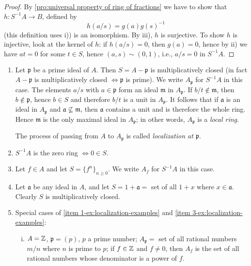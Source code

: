 \begin{proof}
By \eqref{pro:universal property of ring of fractions} we have to show that $h \colon S^{-1}A \to B$, defined by
\[
    h(a/s) = g(a)g(s)^{-1}
\]
(this definition uses i)) is an isomorphism. By iii), $h$ is surjective. To show $h$ is injective, look at the kernel of $h$: if $h(a/s) = 0$, then $g(a) = 0$, hence by ii) we have $at = 0$ for some $t \in S$, hence $(a, s) \sim (0, 1)$, i.e., $a/s = 0$ in $S^{-1}A$.
\end{proof}

\begin{examples}\label{ex:localization-examples}
\begin{enumerate}[(1)]
    \item \label{item 1-ex:localization-examples} Let $\mathfrak{p}$ be a prime ideal of $A$. Then $S = A - \mathfrak{p}$ is multiplicatively closed (in fact $A - \mathfrak{p}$ is multiplicatively closed $\iff \mathfrak{p}$ is prime). We write $A_{\mathfrak{p}}$ for $S^{-1}A$ in this case. The elements $a/s$ with $a \in \mathfrak{p}$ form an ideal $\mathfrak{m}$ in $A_{\mathfrak{p}}$. If $b/t \notin \mathfrak{m}$, then $b \notin \mathfrak{p}$, hence $b \in S$ and therefore $b/t$ is a unit in $A_{\mathfrak{p}}$. It follows that if $\mathfrak{a}$ is an ideal in $A_{\mathfrak{p}}$ and $\mathfrak{a} \not\subseteq \mathfrak{m}$, then $\mathfrak{a}$ contains a unit and is therefore the whole ring. Hence $\mathfrak{m}$ is the only maximal ideal in $A_{\mathfrak{p}}$; in other words, $A_{\mathfrak{p}}$ is a \emph{local ring}.

    The process of passing from $A$ to $A_{\mathfrak{p}}$ is called \emph{localization at $\mathfrak{p}$}.

    \item \label{item 2-ex:localization-examples} $S^{-1}A$ is the zero ring $\iff 0 \in S$.
    \item \label{item 3-ex:localization-examples} Let $f \in A$ and let $S = \{f^n\}_{n \geq 0}$. We write $A_f$ for $S^{-1}A$ in this case.
    \item \label{item 4-ex:localization-examples} Let $\mathfrak{a}$ be any ideal in $A$, and let $S = 1 + \mathfrak{a} = $ set of all $1 + x$ where $x \in \mathfrak{a}$. Clearly $S$ is multiplicatively closed.
    \item Special cases of \eqref{item 1-ex:localization-examples} and \eqref{item 3-ex:localization-examples}:
    \begin{enumerate}[i)]
        \item $A = \mathbb{Z}$, $\mathfrak{p} = (p)$, $p$ a prime number; $A_{\mathfrak{p}} = $ set of all rational numbers $m/n$ where $n$ is prime to $p$; if $f \in \mathbb{Z}$ and $f \neq 0$, then $A_f$ is the set of all rational numbers whose denominator is a power of $f$.


\end{enumerate}
\end{enumerate}
\end{examples}
